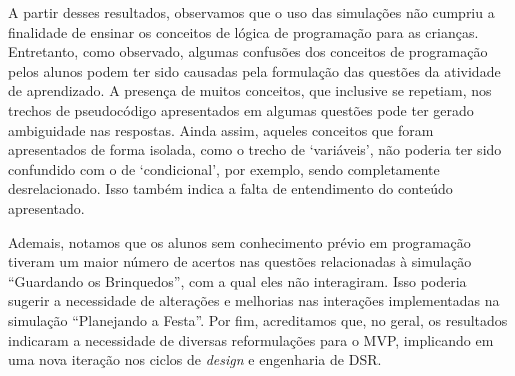 A partir desses resultados, observamos que o uso das simulações não cumpriu a finalidade de ensinar os conceitos de lógica de programação para as crianças. Entretanto, como observado, algumas confusões dos conceitos de programação pelos alunos podem ter sido causadas pela formulação das questões da atividade de aprendizado. A presença de muitos conceitos, que inclusive se repetiam, nos trechos de pseudocódigo apresentados em algumas questões pode ter gerado ambiguidade nas respostas. Ainda assim, aqueles conceitos que foram apresentados de forma isolada, como o trecho de \enquote*{variáveis}, não poderia ter sido confundido com o de \enquote*{condicional}, por exemplo, sendo completamente desrelacionado. Isso também indica a falta  de entendimento do conteúdo apresentado.

Ademais, notamos que os alunos sem conhecimento prévio em programação tiveram um maior número de acertos nas questões relacionadas à simulação \enquote{Guardando os Brinquedos}, com a qual eles não interagiram. Isso poderia sugerir a necessidade de alterações e melhorias nas interações implementadas na simulação \enquote{Planejando a Festa}. Por fim, acreditamos que, no geral, os resultados indicaram a necessidade de diversas reformulações para o MVP, implicando em uma nova iteração nos ciclos de \textit{design} e engenharia de DSR.

